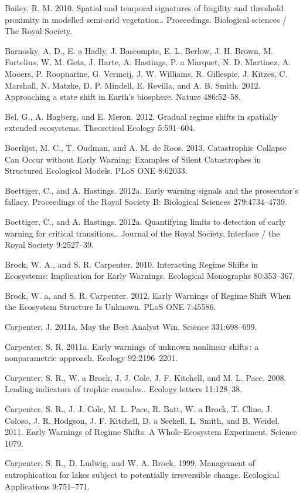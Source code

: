 \documentclass{article}
\begin{document}
Bailey, R. M. 2010. Spatial and temporal signatures of fragility and
threshold proximity in modelled semi-arid vegetation.. Proceedings.
Biological sciences / The Royal Society.

Barnosky, A. D., E. a Hadly, J. Bascompte, E. L. Berlow, J. H. Brown, M.
Fortelius, W. M. Getz, J. Harte, A. Hastings, P. a Marquet, N. D.
Martinez, A. Mooers, P. Roopnarine, G. Vermeij, J. W. Williams, R.
Gillespie, J. Kitzes, C. Marshall, N. Matzke, D. P. Mindell, E. Revilla,
and A. B. Smith. 2012. Approaching a state shift in Earth's biosphere.
Nature 486:52--58.

Bel, G., A. Hagberg, and E. Meron. 2012. Gradual regime shifts in
spatially extended ecosystems. Theoretical Ecology 5:591--604.

Boerlijst, M. C., T. Oudman, and A. M. de Roos. 2013. Catastrophic
Collapse Can Occur without Early Warning: Examples of Silent
Catastrophes in Structured Ecological Models. PLoS ONE 8:62033.

Boettiger, C., and A. Hastings. 2012a. Early warning signals and the
prosecutor's fallacy. Proceedings of the Royal Society B: Biological
Sciences 279:4734--4739.

Boettiger, C., and A. Hastings. 2012a. Quantifying limits to detection
of early warning for critical transitions.. Journal of the Royal
Society, Interface / the Royal Society 9:2527--39.

Brock, W. A., and S. R. Carpenter. 2010. Interacting Regime Shifts in
Ecosystems: Implication for Early Warnings. Ecological Monographs
80:353--367.

Brock, W. a, and S. R. Carpenter. 2012. Early Warnings of Regime Shift
When the Ecosystem Structure Is Unknown. PLoS ONE 7:45586.

Carpenter, J. 2011a. May the Best Analyst Win. Science 331:698--699.

Carpenter, S. R. 2011a. Early warnings of unknown nonlinear shifts : a
nonparametric approach. Ecology 92:2196--2201.

Carpenter, S. R., W. a Brock, J. J. Cole, J. F. Kitchell, and M. L.
Pace. 2008. Leading indicators of trophic cascades.. Ecology letters
11:128--38.

Carpenter, S. R., J. J. Cole, M. L. Pace, R. Batt, W. a Brock, T. Cline,
J. Coloso, J. R. Hodgson, J. F. Kitchell, D. a Seekell, L. Smith, and B.
Weidel. 2011. Early Warnings of Regime Shifts: A Whole-Ecosystem
Experiment. Science 1079.

Carpenter, S. R., D. Ludwig, and W. A. Brock. 1999. Management of
eutrophication for lakes subject to potentially irreversible change.
Ecological Applications 9:751--771.
\end{document}
